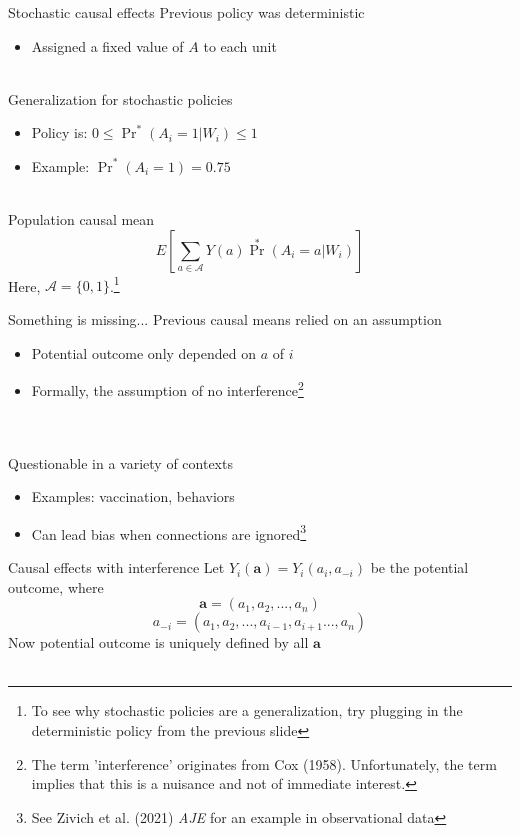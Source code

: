 \documentclass{beamer}
\begin{document}
\begin{frame}{Stochastic causal effects}
	Previous policy was deterministic
	\begin{itemize}
		\item Assigned a fixed value of $A$ to each unit
	\end{itemize}~\\
	Generalization for stochastic policies
	\begin{itemize}
		\item Policy is: $0 \le \Pr^*(A_i=1 | W_i) \le 1$
		\item Example: $\Pr^*(A_i=1) = 0.75$
	\end{itemize}~\\
	Population causal mean
	\[E \left[ \sum_{a \in \mathcal{A}} Y(a) \Pr^*(A_i=a | W_i) \right]\]
	Here, $\mathcal{A} = \{0,1\}$.\footnote[frame]{To see why stochastic policies are a generalization, try plugging in the deterministic policy from the previous slide}
\end{frame}

\begin{frame}{Something is missing...}
	Previous causal means relied on an assumption
	\begin{itemize}
		\item Potential outcome only depended on $a$ of $i$
		\item Formally, the assumption of no interference\footnote[frame]{The term 'interference' originates from Cox (1958). Unfortunately, the term implies that this is a nuisance and not of immediate interest.}
	\end{itemize}~\\~\\
	Questionable in a variety of contexts
	\begin{itemize}
		\item Examples: vaccination, behaviors
		\item Can lead bias when connections are ignored\footnote[frame]{See Zivich et al. (2021) \textit{AJE} for an example in observational data}
	\end{itemize}
\end{frame}

\begin{frame}{Causal effects with interference}
	Let $Y_i(\mathbf{a}) = Y_i(a_i, a_{-i})$ be the potential outcome, where
	\[\mathbf{a} = (a_1, a_2, ..., a_n)\]
	\[a_{-i} = (a_1, a_2, ..., a_{i-1}, a_{i+1} ..., a_n)\]
	Now potential outcome is uniquely defined by all $\mathbf{a}$\\~\\
\end{frame}
\end{document}
